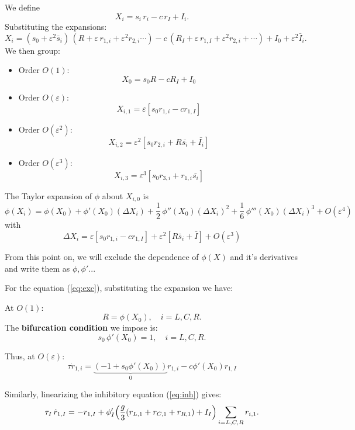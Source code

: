 \documentclass[ENG]{fancynotes}
\begin{document}
We define
\begin{equation}
  X_i = s_i\,r_i - c\,r_I + I_i.
  \label{eq:argument}
\end{equation}
Substituting the expansions:
\[
X_i = (s_0+ \varepsilon^2 \bar{s}_i)\,(R + \varepsilon\,r_{1,i} +\varepsilon^2 r_{2,i} \cdots) - c\,(R_I + \varepsilon\,r_{1,I}+\varepsilon^2 r_{2,i} +\cdots) + I_0 +\varepsilon^2 \bar{I}_i .
\]
We then group:
\begin{itemize}
  \item Order \(O(1)\):
    \[
X_0 = s_0 R - c R_I +I_0
    \]
  \item Order \(O(\varepsilon)\):
    \[
   X_{i,1} = \varepsilon [s_0 r_{1,i}- cr_{1,I}]
    \]
  \item Order \(O(\varepsilon^2)\): 
\[
X_{i,2} = \varepsilon^2 [s_0 r_{2,i}+ R\bar{s_i} + \bar{I_i}]
\]
  \item Order \(O(\varepsilon^3)\): 
\[
X_{i,3} = \varepsilon^3 [s_0 r_{3,i}+ r_{1,i}\bar{s_i}]
\]
\end{itemize}






The Taylor expansion of \(\phi\) about \(X_{i,0}\) is
\begin{equation}
\phi(X_i) = \phi(X_0) + \phi'(X_0) (\Delta X_i) + \frac{1}{2}\,\phi''(X_0) (\Delta X_i)^2 +\frac{1}{6}\,\phi'''(X_0) (\Delta X_i)^3+ O(\varepsilon^4)
\label{eq:taylor_exp}
\end{equation}
with
\[
\Delta X_i = \varepsilon [s_0 r_{1,i}- cr_{1,I}] + \varepsilon^2[R\bar{s}_i + \bar{I}] + O(\varepsilon^3)
\]


From this point on, we will exclude the dependence of $\phi(X)$ and it's derivatives and write them as $\phi, \phi'...$


For the equation (\ref{eq:exc}), substituting the expansion we have:


At \(O(1)\):
\[
R = \phi(X_{0}), \quad i=L,C,R.
\]
The \textbf{bifurcation condition} we impose is:
\begin{equation}
  s_0\,\phi'(X_{0}) = 1, \quad i=L,C,R.
  \label{eq:bifurcation_condition}
\end{equation}


Thus, at \(O(\varepsilon)\):
\[
\tau \dot{r}_{1,i} = \underbrace{(-1+s_{0} \phi'(X_0))}_0 r_{1,i} - c\phi'(X_0)r_{1,I}
\]




Similarly, linearizing the inhibitory equation (\ref{eq:inh}) gives:
\begin{equation}
  \tau_I\,\dot{r}_{1,I} = -r_{1,I} + \phi_I'\Bigl(\frac{g}{3}(r_{L,1}+r_{C,1}+r_{R,1})+I_I\Bigr)\sum_{i=L,C,R}r_{i,1}.
  \label{eq:order1_inhibitory}
\end{equation}
\end{document}
